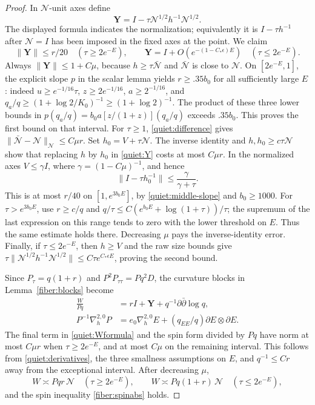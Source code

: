 \begin{proof}
In \(\mathcal N\)-unit axes define
\begin{equation}\label{quiet:Y}
 \mathbf Y=I-\tau\mathcal N^{1/2}h^{-1}\mathcal N^{1/2}.
\end{equation}
The displayed formula indicates the normalization; equivalently it is
\(I-\tau h^{-1}\) after \(\mathcal N=I\) has been imposed in the
fixed axes at the point.  We claim
\begin{equation}\label{quiet:Ybounds}
 \|\mathbf Y\|\le r/20\quad(\tau\ge2e^{-E}),\qquad
 \mathbf Y=I+O(e^{-(1-C_*\epsilon)E})
                         \quad(\tau\le2e^{-E}).
\end{equation}
Always \(\|\mathbf Y\|\le1+C\mu\), because
\(h\ge\tau\bar{\mathcal N}\) and
\(\bar{\mathcal N}\) is close to \(\mathcal N\).
On \([2e^{-E},1]\), the explicit slope \(p\) in the scalar lemma yields
\(r\ge .35b_0\) for all sufficiently large \(E\): indeed
\(u\ge e^{-1/16}\tau\), \(z\ge2e^{-1/16}\),
\(a\ge2^{-1/16}\), and
\(q_a/q\ge(1+\log2/K_0)^{-1}\ge(1+\log2)^{-1}\).
The product of these three lower bounds in
\(p(q_a/q)=b_0a[z/(1+z)](q_a/q)\) exceeds \(.35b_0\).
This proves the first bound on that interval.
For \(\tau\ge1\), \eqref{quiet:difference} gives
\(\|\bar{\mathcal N}-\mathcal N\|_{\mathcal N}\le C\mu r\).
Set \(h_0=V+\tau\mathcal N\).  The inverse identity and
\(h,h_0\ge c\tau\mathcal N\) show that replacing \(h\) by \(h_0\) in
\eqref{quiet:Y} costs at most \(C\mu r\).  In the normalized axes
\(V\le\gamma I\), where \(\gamma=(1-C\mu)^{-1}\), and hence
\[
 \|I-\tau h_0^{-1}\|\le\frac\gamma{\gamma+\tau}.
\]
This is at most \(r/40\) on \([1,e^{3b_0E}]\), by
\eqref{quiet:middle-slope} and \(b_0\ge1000\).
For \(\tau>e^{3b_0E}\), use \(r\ge c/q\) and
\(q/\tau\le C(e^{b_0E}+\log(1+\tau))/\tau\); the supremum of the
last expression on this range tends to zero with the lower threshold
on \(E\).  Thus the same estimate holds there.  Decreasing \(\mu\) pays
the inverse-identity error.  Finally, if \(\tau\le2e^{-E}\), then
\(h\ge V\) and the raw size bounds give
\(\tau\|\mathcal N^{1/2}h^{-1}\mathcal N^{1/2}\|
 \le C\tau e^{C_*\epsilon E}\), proving the second bound.

Since \(P_\tau=q(1+r)\) and
\(P^2P_{\tau\tau}=Pq^2D\), the curvature blocks in
Lemma~\ref{fiber:blocks} become
\begin{align}
 \frac W{Pq}&=rI+\mathbf Y+q^{-1}\partial\bar\partial\log q,
 \label{quiet:Wformula}\\
 P^{-1}\nabla_h^{2,0}P
     &=e_0\nabla_h^{2,0}E+(q_{EE}/q)\partial E\otimes\partial E.
 \label{quiet:spinformula}
\end{align}
The final term in \eqref{quiet:Wformula} and the spin form divided by
\(Pq\) have norm at most \(C\mu r\) when \(\tau\ge2e^{-E}\),
and at most \(C\mu\) on the remaining interval.  This follows from
\eqref{quiet:derivatives}, the three smallness assumptions on \(E\), and
\(q^{-1}\le Cr\) away from the exceptional interval.
After decreasing \(\mu\),
\begin{equation}\label{quiet:Wbounds}
 W\asymp Pqr\,\mathcal N\quad(\tau\ge2e^{-E}),\qquad
 W\asymp Pq(1+r)\,\mathcal N\quad(\tau\le2e^{-E}),
\end{equation}
and the spin inequality \eqref{fiber:spinabs} holds.


\end{proof}
